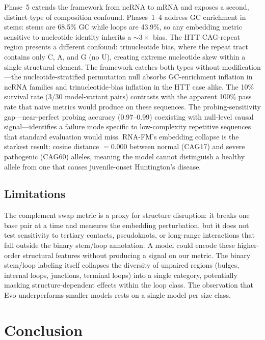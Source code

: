 \documentclass[11pt]{article}
\begin{document}
Phase~5 extends the framework from ncRNA to mRNA and exposes a second,
distinct type of composition confound.  Phases~1--4 address GC
enrichment in stems: stems are 68.5\% GC while loops are 43.9\%, so
any embedding metric sensitive to nucleotide identity inherits a
${\sim}3\times$ bias.  The HTT CAG-repeat region presents a different
confound: trinucleotide bias, where the repeat tract contains only C,
A, and G (no U), creating extreme nucleotide skew within a single
structural element.  The framework catches both types without
modification---the nucleotide-stratified permutation null absorbs
GC-enrichment inflation in ncRNA families and trinucleotide-bias
inflation in the HTT case alike.  The 10\% survival rate (3/30
model-variant pairs) contrasts with the apparent 100\% pass rate that
naive metrics would produce on these sequences.  The
probing-sensitivity gap---near-perfect probing accuracy (0.97--0.99)
coexisting with null-level causal signal---identifies a failure mode
specific to low-complexity repetitive sequences that standard
evaluation would miss.  RNA-FM's embedding collapse is the starkest
result: cosine distance $= 0.000$ between normal (CAG17) and severe
pathogenic (CAG60) alleles, meaning the model cannot distinguish a
healthy allele from one that causes juvenile-onset Huntington's
disease.

\subsection{Limitations}
\label{sec:limitations}

The complement swap metric is a proxy for structure disruption: it
breaks one base pair at a time and measures the embedding perturbation,
but it does not test sensitivity to tertiary contacts, pseudoknots, or
long-range interactions that fall outside the binary stem/loop
annotation.  A model could encode these higher-order structural
features without producing a signal on our metric.  The binary
stem/loop labeling itself collapses the diversity of unpaired regions
(bulges, internal loops, junctions, terminal loops) into a single
category, potentially masking structure-dependent effects within the
loop class.  The observation that Evo underperforms smaller models
rests on a single model per size class.


\section{Conclusion}
\label{sec:conclusion}
\end{document}
